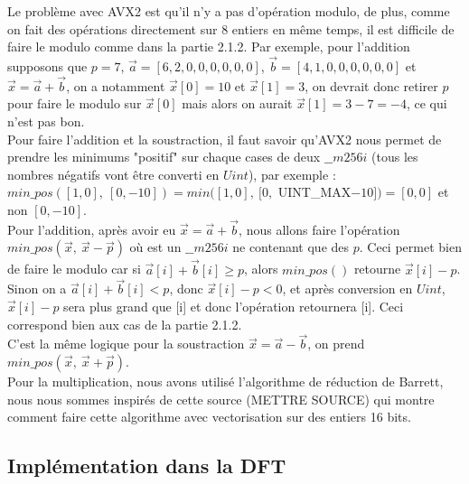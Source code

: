 \documentclass[12pt, a4paper]{article}
\begin{document}
Le problème avec AVX2 est qu'il n'y a pas d'opération modulo, de plus, comme on fait des opérations directement sur 8 entiers en même temps, il est difficile de faire le modulo comme dans la partie 2.1.2. Par exemple, pour l'addition supposons que $p = 7$, $\overrightarrow{a} = [6, 2, 0, 0, 0, 0, 0, 0]$, $\overrightarrow{b} = [4, 1, 0, 0, 0, 0, 0, 0]$ et $\overrightarrow{x} = \overrightarrow{a}+\overrightarrow{b}$, on a notamment $\overrightarrow{x}[0] = 10$ et $\overrightarrow{x}[1] = 3$, on devrait donc retirer $p$ pour faire le modulo sur $\overrightarrow{x}[0]$ mais alors on aurait $\overrightarrow{x}[1] = 3-7 = -4$, ce qui n'est pas bon.\\ 
Pour faire l'addition et la soustraction, il faut savoir qu'AVX2 nous permet de prendre les minimums "positif" sur chaque cases de deux $\_\_m256i$ (tous les nombres négatifs vont être converti en $Uint$), par exemple :\\ $min\_pos([1, 0],\  [0, -10]) = min([1, 0], \ [0,$ UINT\_MAX$-10]) = [0, 0]$ et non $[0, -10]$. \\
Pour l'addition, après avoir eu $\overrightarrow{x} = \overrightarrow{a}+\overrightarrow{b}$, nous allons faire l'opération $min\_pos(\overrightarrow{x},\ \overrightarrow{x}-\overrightarrow{p})$ où  est un $\_\_m256i$ ne contenant que des $p$. Ceci permet bien de faire le modulo car si $\overrightarrow{a}[i] + \overrightarrow{b}[i] \geq p$, alors $min\_pos()$ retourne $\overrightarrow{x}[i] - p$. Sinon on a $\overrightarrow{a}[i] + \overrightarrow{b}[i] < p$, donc $\overrightarrow{x}[i]-p < 0$, et après conversion en $Uint$, $\overrightarrow{x}[i]-p$ sera plus grand que [i] et donc l'opération retournera [i]. Ceci correspond bien aux cas de la partie 2.1.2. \\
C'est la même logique pour la soustraction $\overrightarrow{x} = \overrightarrow{a}-\overrightarrow{b}$, on prend $min\_pos(\overrightarrow{x},\ \overrightarrow{x}+\overrightarrow{p})$. \\
Pour la multiplication, nous avons utilisé l'algorithme de réduction de Barrett, nous nous sommes inspirés de cette source (METTRE SOURCE) qui montre comment faire cette algorithme avec vectorisation sur des entiers 16 bits.

\subsection{Implémentation dans la DFT}
\end{document}

